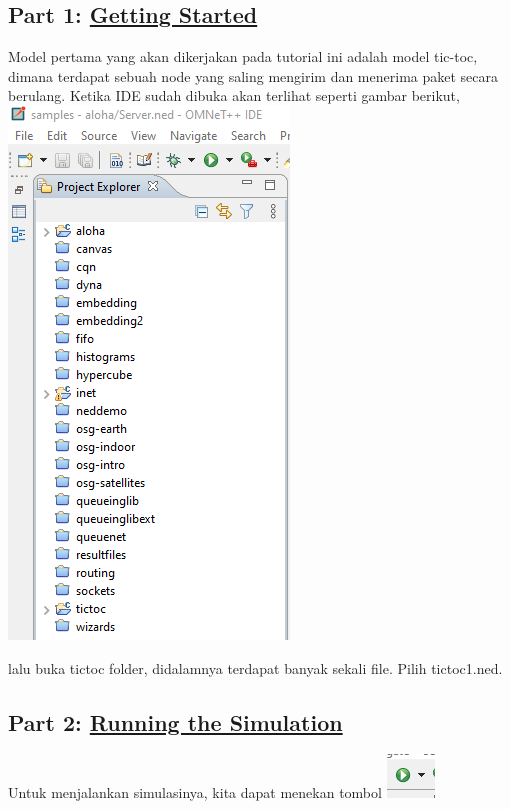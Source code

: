 \documentclass[conference]{IEEEtran}
\begin{document}
\subsection{Part 1: \href{https://docs.omnetpp.org/tutorials/tictoc/part1/}{Getting Started}}
Model pertama yang akan dikerjakan pada tutorial ini adalah model tic-toc, dimana terdapat sebuah node yang saling mengirim dan menerima paket secara berulang. Ketika IDE sudah dibuka akan terlihat seperti gambar berikut,
\includegraphics[scale=0.9]{images/samples-directory.png}


lalu buka tictoc folder, didalamnya terdapat banyak sekali file. Pilih tictoc1.ned.

\subsection{Part 2: \href{https://docs.omnetpp.org/tutorials/tictoc/part2/}{Running the Simulation}}
Untuk menjalankan simulasinya, kita dapat menekan tombol \break
\includegraphics[scale=0.9]{images/run-button.png}
\end{document}
